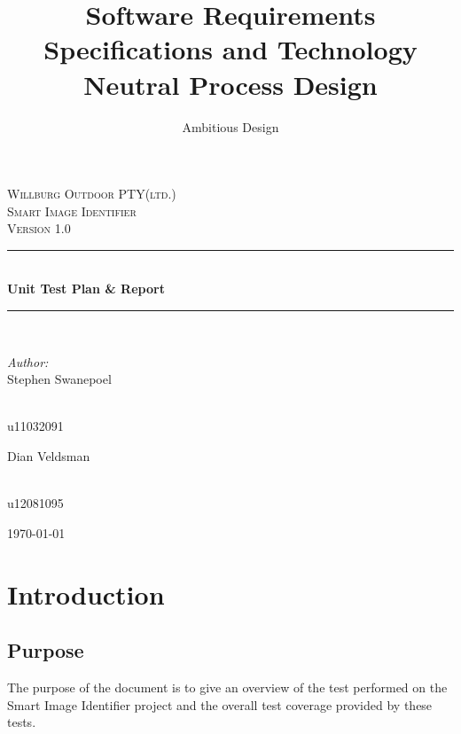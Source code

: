 \documentclass[a4paper,12pt]{report}
\author{Ambitious Design}
\title{ Software Requirements Specifications and Technology Neutral Process Design}
\newcommand{\HRule}{\rule{\linewidth}{0.5mm}}
\begin{document}
\setlength{\parskip}{6pt}
\begin{titlepage}

\begin{center}
\textsc{\LARGE Willburg Outdoor PTY(ltd.)}\\[1.5cm]
\textsc{\Large Smart Image Identifier }\\[1.0cm]
\textsc{\Large Version 1.0 }\\[0.5cm]
\HRule \\[0.4cm]
{ \huge \bfseries Unit Test Plan \& Report}\\[0.4cm]
\HRule \\[0.4cm]
\begin{minipage}{0.4\textwidth}
\begin{flushleft} \large
\emph{Author:}\\
Stephen {Swanepoel}
\end{flushleft}
\end{minipage}
\begin{minipage}{0.4\textwidth}
\begin{flushright} \large
\emph{} \\
u11032091
\end{flushright}
\end{minipage}
\begin{minipage}{0.4\textwidth}
\begin{flushleft} \large
Dian {Veldsman}
\end{flushleft}
\end{minipage}
\begin{minipage}{0.4\textwidth}
\begin{flushright} \large
\emph{} \\
u12081095
\end{flushright}
\end{minipage}


{\large \today}
\end{center}
\end{titlepage}
\footnotesize
\normalsize

\newpage
\tableofcontents

\renewcommand{\thesection}{\arabic{section}}
\newpage

\section {Introduction}
	\subsection {Purpose}
		The purpose of the document is to give an overview of the test performed on the Smart Image Identifier project and the overall test coverage provided by these tests.
\end{document}
